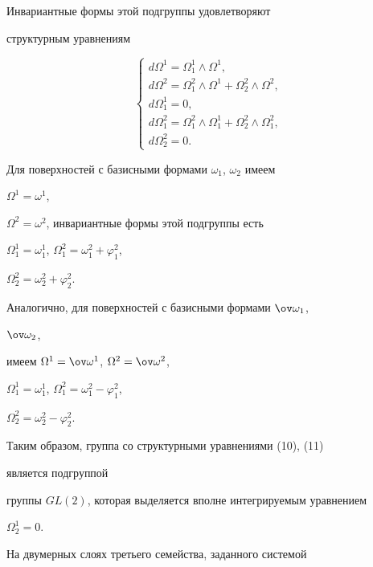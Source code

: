 Инвариантные формы этой подгруппы удовлетворяют 


структурным уравнениям 


\begin{equation} 


\begin{cases} 


d\Omega^1=\Omega^1_1\wedge\Omega^1, \\ 


d\Omega^2=\Omega^2_1\wedge\Omega^1+\Omega^2_2\wedge\Omega^2, \\ 


d\Omega^1_1=0, \\ 


d\Omega^2_1=\Omega^2_1\wedge\Omega^1_1+ 


\Omega^2_2\wedge\Omega^2_1, \\ 


d\Omega^2_2=0. 


\end{cases} 


\end{equation} 


Для поверхностей с базисными формами $\omega_1$, $\omega_2$ имеем 


$\Omega^1=\omega^1$, 


$\Omega^2=\omega^2$, инвариантные формы этой подгруппы есть 


$\Omega^1_1=\omega^1_1$, $\Omega^2_1=\omega^2_1+\varphi^2_1$, 


$\Omega^2_2=\omega^2_2+\varphi^2_2$. 


Аналогично, для поверхностей с базисными формами $\ov\omega_1$, 


$\ov\omega_2$, 


имеем $\Omega^1=\ov\omega^1$, $\Omega^2=\ov\omega^2$, 


$\Omega^1_1=\omega^1_1$, $\Omega^2_1=\omega^2_1-\varphi^2_1$, 


$\Omega^2_2=\omega^2_2-\varphi^2_2$. 


 


Таким образом, группа со структурными уравнениями (10), (11) 


является подгруппой 


группы $GL(2)$, которая выделяется вполне интегрируемым уравнением 


$\Omega^1_2=0$. 


 


На двумерных слоях третьего семейства, заданного системой 


